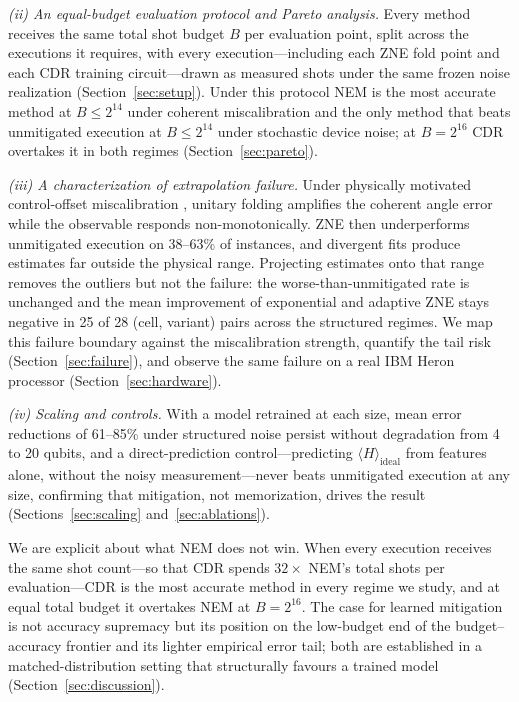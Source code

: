 \documentclass[11pt]{article}
\newcommand{\expect}[1]{\langle#1\rangle}
\newcommand{\Hideal}{\expect{H}_{\mathrm{ideal}}}
\begin{document}
\emph{(ii) An equal-budget evaluation protocol and Pareto analysis.} Every method receives the same total shot budget $B$ per evaluation point, split across the executions it requires, with every execution---including each ZNE fold point and each CDR training circuit---drawn as measured shots under the same frozen noise realization (Section~\ref{sec:setup}). Under this protocol NEM is the most accurate method at $B\le 2^{14}$ under coherent miscalibration and the only method that beats unmitigated execution at $B\le 2^{14}$ under stochastic device noise; at $B=2^{16}$ CDR overtakes it in both regimes (Section~\ref{sec:pareto}).

\emph{(iii) A characterization of extrapolation failure.} Under physically motivated control-offset miscalibration \citep{krantz2019engineer}, unitary folding amplifies the coherent angle error while the observable responds non-monotonically. ZNE then underperforms unmitigated execution on 38--63\% of instances, and divergent fits produce estimates far outside the physical range. Projecting estimates onto that range removes the outliers but not the failure: the worse-than-unmitigated rate is unchanged and the mean improvement of exponential and adaptive ZNE stays negative in 25 of 28 (cell, variant) pairs across the structured regimes. We map this failure boundary against the miscalibration strength, quantify the tail risk (Section~\ref{sec:failure}), and observe the same failure on a real IBM Heron processor (Section~\ref{sec:hardware}).

\emph{(iv) Scaling and controls.} With a model retrained at each size, mean error reductions of 61--85\% under structured noise persist without degradation from 4 to 20 qubits, and a direct-prediction control---predicting $\Hideal$ from features alone, without the noisy measurement---never beats unmitigated execution at any size, confirming that mitigation, not memorization, drives the result (Sections~\ref{sec:scaling} and~\ref{sec:ablations}).

We are explicit about what NEM does not win. When every execution receives the same shot count---so that CDR spends $32\times$ NEM's total shots per evaluation---CDR is the most accurate method in every regime we study, and at equal total budget it overtakes NEM at $B=2^{16}$. The case for learned mitigation is not accuracy supremacy but its position on the low-budget end of the budget--accuracy frontier and its lighter empirical error tail; both are established in a matched-distribution setting that structurally favours a trained model (Section~\ref{sec:discussion}).
\end{document}
